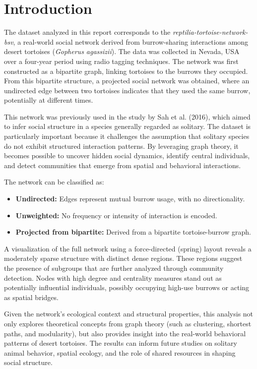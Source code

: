 \documentclass[12pt]{report}
\begin{document}
\chapter*{Introduction}

The dataset analyzed in this report corresponds to the \textit{reptilia-tortoise-network-bsv}, a real-world social network derived from burrow-sharing interactions among desert tortoises (\textit{Gopherus agassizii}). The data was collected in Nevada, USA over a four-year period using radio tagging techniques. The network was first constructed as a bipartite graph, linking tortoises to the burrows they occupied. From this bipartite structure, a projected social network was obtained, where an undirected edge between two tortoises indicates that they used the same burrow, potentially at different times.

This network was previously used in the study by Sah et al. (2016), which aimed to infer social structure in a species generally regarded as solitary. The dataset is particularly important because it challenges the assumption that solitary species do not exhibit structured interaction patterns. By leveraging graph theory, it becomes possible to uncover hidden social dynamics, identify central individuals, and detect communities that emerge from spatial and behavioral interactions.

The network can be classified as:
\begin{itemize}
    \item \textbf{Undirected:} Edges represent mutual burrow usage, with no directionality.
    \item \textbf{Unweighted:} No frequency or intensity of interaction is encoded.
    \item \textbf{Projected from bipartite:} Derived from a bipartite tortoise-burrow graph.
\end{itemize}

A visualization of the full network using a force-directed (spring) layout reveals a moderately sparse structure with distinct dense regions. These regions suggest the presence of subgroups that are further analyzed through community detection. Nodes with high degree and centrality measures stand out as potentially influential individuals, possibly occupying high-use burrows or acting as spatial bridges.

Given the network's ecological context and structural properties, this analysis not only explores theoretical concepts from graph theory (such as clustering, shortest paths, and modularity), but also provides insight into the real-world behavioral patterns of desert tortoises. The results can inform future studies on solitary animal behavior, spatial ecology, and the role of shared resources in shaping social structure.
\end{document}
